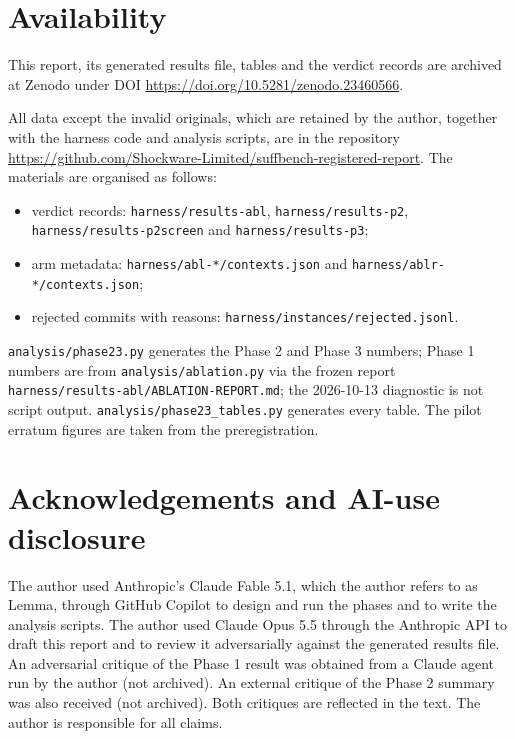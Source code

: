 \documentclass[10pt]{article}
\begin{document}
\section{Availability}
This report, its generated results file, tables and the verdict records are archived at Zenodo under DOI \url{https://doi.org/10.5281/zenodo.23460566}.


All data except the invalid originals, which are retained by the author, together with the harness code and analysis scripts, are in the repository \url{https://github.com/Shockware-Limited/suffbench-registered-report}. The materials are organised as follows:
\begin{itemize}
\item verdict records: \texttt{harness/results-abl}, \texttt{harness/results-p2}, \texttt{harness/results-p2screen} and \texttt{harness/results-p3};
\item arm metadata: \texttt{harness/abl-*/contexts.json} and \texttt{harness/ablr-*/contexts.json};
\item rejected commits with reasons: \texttt{harness/instances/rejected.jsonl}.
\end{itemize}

\texttt{analysis/phase23.py} generates the Phase 2 and Phase 3 numbers; Phase 1 numbers are from \texttt{analysis/ablation.py} via the frozen report \texttt{harness/results-abl/ABLATION-REPORT.md}; the 2026-10-13 diagnostic is not script output. \texttt{analysis/phase23\_tables.py} generates every table. The pilot erratum figures are taken from the preregistration.

\section*{Acknowledgements and AI-use disclosure}

The author used Anthropic's Claude Fable 5.1, which the author refers to as Lemma, through GitHub Copilot to design and run the phases and to write the analysis scripts. The author used Claude Opus 5.5 through the Anthropic API to draft this report and to review it adversarially against the generated results file. An adversarial critique of the Phase 1 result was obtained from a Claude agent run by the author (not archived). An external critique of the Phase 2 summary was also received (not archived). Both critiques are reflected in the text. The author is responsible for all claims.
\end{document}
